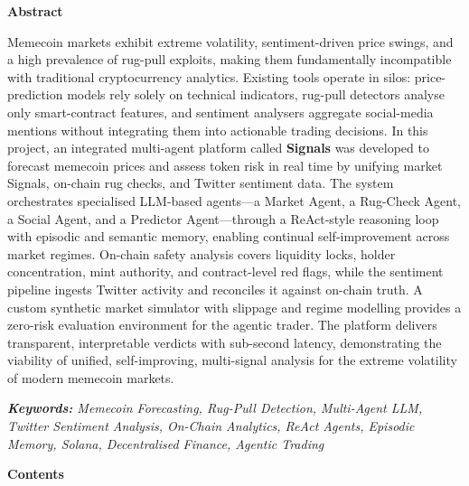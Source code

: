 \documentclass[12pt,a4paper,oneside,openany]{book}
\begin{document}
\vspace{15mm}

\noindent

\clearpage
\thispagestyle{empty}
\begin{center}
  {\fontsize{18}{22}\selectfont\bfseries Abstract}\\[10mm]
\end{center}

\noindent
Memecoin markets exhibit extreme volatility, sentiment-driven price swings, and a high prevalence of rug-pull exploits, making them fundamentally incompatible with traditional cryptocurrency analytics. Existing tools operate in silos: price-prediction models rely solely on technical indicators, rug-pull detectors analyse only smart-contract features, and sentiment analysers aggregate social-media mentions without integrating them into actionable trading decisions. In this project, an integrated multi-agent platform called \textbf{Signals} was developed to forecast memecoin prices and assess token risk in real time by unifying market Signals, on-chain rug checks, and Twitter sentiment data. The system orchestrates specialised LLM-based agents---a Market Agent, a Rug-Check Agent, a Social Agent, and a Predictor Agent---through a ReAct-style reasoning loop with episodic and semantic memory, enabling continual self-improvement across market regimes. On-chain safety analysis covers liquidity locks, holder concentration, mint authority, and contract-level red flags, while the sentiment pipeline ingests Twitter activity and reconciles it against on-chain truth. A custom synthetic market simulator with slippage and regime modelling provides a zero-risk evaluation environment for the agentic trader. The platform delivers transparent, interpretable verdicts with sub-second latency, demonstrating the viability of unified, self-improving, multi-signal analysis for the extreme volatility of modern memecoin markets.

\vspace{8mm}

\noindent
\textit{\textbf{Keywords:} Memecoin Forecasting, Rug-Pull Detection, Multi-Agent LLM, Twitter Sentiment Analysis, On-Chain Analytics, ReAct Agents, Episodic Memory, Solana, Decentralised Finance, Agentic Trading}

\clearpage
\pagestyle{empty}
\thispagestyle{empty}
\begin{center}
  {\fontsize{18}{22}\selectfont\bfseries Contents}
\end{center}
\vspace{8mm}
\makeatletter
{}
\makeatother
\thispagestyle{empty}
\end{document}
